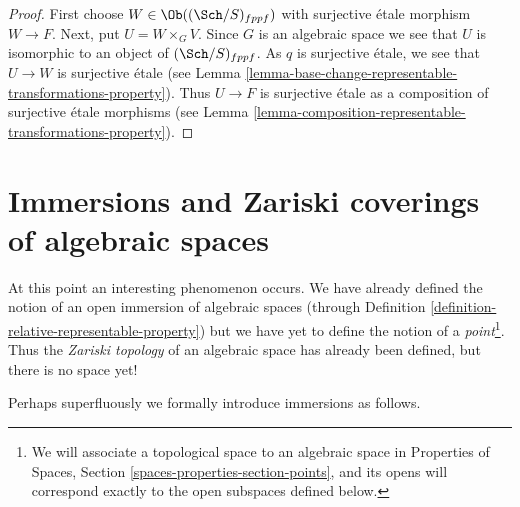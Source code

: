 \begin{proof}
First choose $W \in \Ob((\Sch/S)_{fppf})$
with surjective \'etale morphism $W \to F$.
Next, put $U = W \times_G V$. Since $G$ is an algebraic space
we see that $U$ is isomorphic to an object of $(\Sch/S)_{fppf}$.
As $q$ is surjective \'etale, we see that $U \to W$ is surjective
\'etale (see
Lemma \ref{lemma-base-change-representable-transformations-property}).
Thus $U \to F$ is surjective \'etale as a composition of surjective
\'etale morphisms (see
Lemma \ref{lemma-composition-representable-transformations-property}).
\end{proof}



























\section{Immersions and Zariski coverings of algebraic spaces}
\label{section-Zariski}

\noindent
At this point an interesting phenomenon occurs. We have already defined
the notion of an open immersion of algebraic spaces (through
Definition \ref{definition-relative-representable-property})
but we have yet to define the notion of a {\it point}\footnote{We
will associate a topological space to an algebraic space in
Properties of Spaces, Section
\ref{spaces-properties-section-points},
and its opens will correspond exactly to the open subspaces defined below.}.
Thus the {\it Zariski topology} of an algebraic space
has already been defined, but there is no space yet!

\medskip\noindent
Perhaps superfluously we formally introduce immersions as follows.

